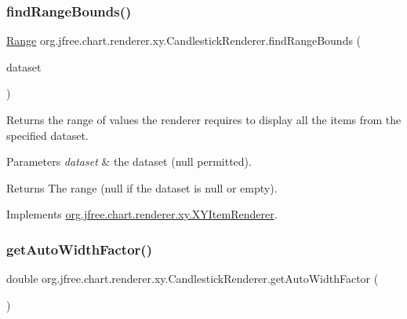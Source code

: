 \subsubsection{\texorpdfstring{find\+Range\+Bounds()}{findRangeBounds()}}
{\footnotesize\ttfamily \mbox{\hyperlink{classorg_1_1jfree_1_1data_1_1_range}{Range}} org.\+jfree.\+chart.\+renderer.\+xy.\+Candlestick\+Renderer.\+find\+Range\+Bounds (\begin{DoxyParamCaption}\item[{\mbox{\hyperlink{interfaceorg_1_1jfree_1_1data_1_1xy_1_1_x_y_dataset}{X\+Y\+Dataset}}}]{dataset }\end{DoxyParamCaption})}

Returns the range of values the renderer requires to display all the items from the specified dataset.


\begin{DoxyParams}{Parameters}
{\em dataset} & the dataset ({\ttfamily null} permitted).\\
\hline
\end{DoxyParams}
\begin{DoxyReturn}{Returns}
The range ({\ttfamily null} if the dataset is {\ttfamily null} or empty). 
\end{DoxyReturn}


Implements \mbox{\hyperlink{interfaceorg_1_1jfree_1_1chart_1_1renderer_1_1xy_1_1_x_y_item_renderer_af9ac6f440e99c73d343de7851e89496a}{org.\+jfree.\+chart.\+renderer.\+xy.\+X\+Y\+Item\+Renderer}}.

\mbox{\label{classorg_1_1jfree_1_1chart_1_1renderer_1_1xy_1_1_candlestick_renderer_ac7b617c9739390cf4e97dfb42d0845d0}} 
\subsubsection{\texorpdfstring{get\+Auto\+Width\+Factor()}{getAutoWidthFactor()}}
{\footnotesize\ttfamily double org.\+jfree.\+chart.\+renderer.\+xy.\+Candlestick\+Renderer.\+get\+Auto\+Width\+Factor (\begin{DoxyParamCaption}{ }\end{DoxyParamCaption})}

